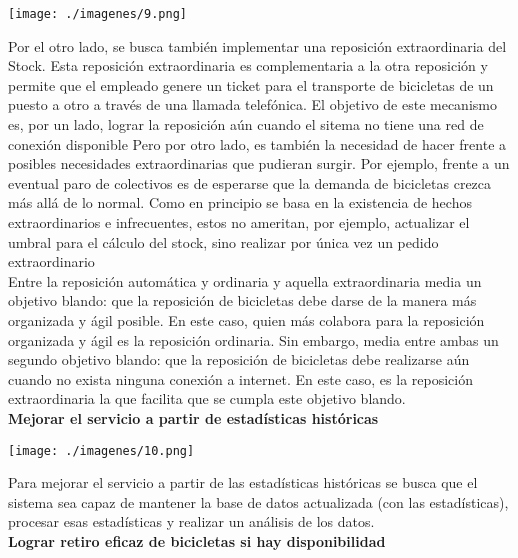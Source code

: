 \documentclass[a4paper, 11pt, spanish]{article}
\begin{document}
\vspace*{0.7cm}
\centerline{\texttt{[image: ./imagenes/9.png]}}
\vspace*{0.7cm}

Por el otro lado, se busca también implementar una reposición extraordinaria del Stock. Esta reposición extraordinaria es complementaria a la otra reposición y permite que el empleado genere un ticket para el transporte de bicicletas de un puesto a otro a través de una llamada telefónica. El objetivo de este mecanismo es, por un lado, lograr la reposición aún cuando el sitema no tiene una red de conexión disponible Pero por otro lado, es también la necesidad de hacer frente a posibles necesidades extraordinarias que pudieran surgir. Por ejemplo, frente a un eventual paro de colectivos es de esperarse que la demanda de bicicletas crezca más allá de lo normal. Como en principio se basa en la existencia de hechos extraordinarios e infrecuentes, estos no ameritan, por ejemplo, actualizar el umbral para el cálculo del stock, sino realizar por única vez un pedido extraordinario\\


Entre la reposición automática y ordinaria y aquella extraordinaria media un objetivo blando: que la reposición de bicicletas debe darse de la manera más organizada y ágil posible. En este caso, quien más colabora para la reposición organizada y ágil es la reposición ordinaria. Sin embargo, media entre ambas un segundo objetivo blando: que la reposición de bicicletas debe realizarse aún cuando no exista ninguna conexión a internet. En este caso, es la reposición extraordinaria la que facilita que se cumpla este objetivo blando.\\


\textbf{Mejorar el servicio a partir de estadísticas históricas}\\

\vspace*{0.7cm}
\centerline{\texttt{[image: ./imagenes/10.png]}}
\vspace*{0.7cm}

Para mejorar el servicio a partir de las estadísticas históricas se busca que el sistema sea capaz de mantener la base de datos actualizada (con las estadísticas), procesar esas estadísticas y realizar un análisis de los datos. \\

\textbf{Lograr retiro eficaz de bicicletas si hay disponibilidad}\\
\end{document}
